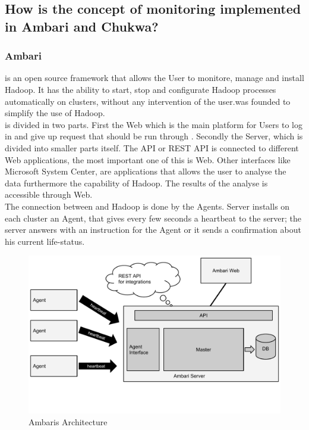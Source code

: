 \subsection{How is the concept of monitoring implemented in Ambari and Chukwa?}
\label{subsec:Implementation}

\subsubsection{Ambari}
\amb is an open source framework that allows the User to monitore, manage and install Hadoop. It has the ability to start, stop and configurate Hadoop processes automatically on clusters, without any intervention of the user.\amb was founded to simplify the use of Hadoop.
\\
\amb is divided in two parts. First the \amb Web which is the main platform for Users to log in and give up request that should be run through \amb. Secondly the \amb Server, which is divided into smaller parts itself. The API or REST API is connected to different Web applications, the most important one of this is \amb Web. Other interfaces like Microsoft System Center, are applications that allows the user to analyse the data furthermore the capability of Hadoop. The results of the analyse is accessible through \amb Web.
\\
The connection between \amb and Hadoop is done by the \amb Agents. \amb Server installs on each cluster an \amb Agent, that gives every few seconds a heartbeat to the server; the server answers with an instruction for the Agent or it sends a confirmation about his current life-status. 
\\
\begin{figure}
\centering
\includegraphics[width=\linewidth,clip=true,trim=0 3cm 0 0]{images/AmbariArchitecture}
\caption{Ambaris Architecture}
\label{fig:AmbariArchitecture}
\end{figure}

